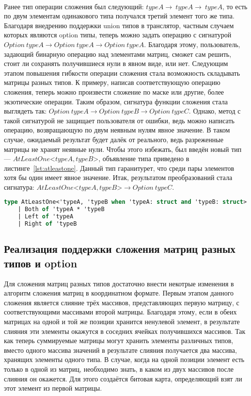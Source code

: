 \documentclass[14pt]{matmex-diploma-custom}
\begin{document}
\paragraph{} Ранее тип операции сложения был следующий: $typeA \rightarrow\ typeA \rightarrow\ typeA$, то есть по двум элементам одинакового типа получался третий элемент того же типа. Благодаря внедрению поддержки union типов в транслятор, частным случаем которых являются option типы, теперь можно задать операцию с сигнатурой $Option\ typeA \rightarrow Option\ typeA \rightarrow Option\ typeA$. Благодаря этому, пользователь, задающий бинарную операцию над элементами матриц, сможет сам решить, стоит ли сохранять получившиеся нули в явном виде, или нет. Следующим этапом повышения гибкости операции сложения стала возможность складывать матрицы разных типов. К примеру, написав соответствующую операцию сложения, теперь можно произвести сложение по маске или другие, более экзотические операции. Таким образом, сигнатура функции сложения стала выглядеть так: $Option\ typeA \rightarrow Option\ typeB \rightarrow Option\ typeC$. Однако, метод с такой сигнатурой не защищает пользователя от ошибки, ведь можно написать операцию, возвращающую по двум неявным нулям явное значение. В таком случае, ожидаемый результат будет далёк от реального, ведь разреженные матрицы не хранят неявные нули. Чтобы этого избежать, был введён новый тип --- $AtLeastOne$<$typeA, typeB$>, объявление типа приведено в листинге~\ref{lst:atleastone}. Данный тип гаранитурет, что среди пары элементов хотя бы один имеет явное значение. Итак, результатом преобразований стала сигнатура: $AtLeastOne$<$typeA, typeB$>$ \rightarrow Option\ typeC$.

\begin{lstlisting}[caption={Объявление типа AtLeastOne},label={lst:atleastone},language=FSharp, basicstyle=\small]
type AtLeastOne<'typeA, 'typeB when 'typeA: struct and 'typeB: struct> =
    | Both of 'typeA * 'typeB
    | Left of 'typeA
    | Right of 'typeB
\end{lstlisting}


\subsection{Реализация поддержки сложения матриц разных типов и option}
Для сложения матриц разных типов достаточно внести некотрые изменения в алгоритм сложения матриц в координатном формате. Первым этапом данного сложения является слияние трёх массивов, представляющих первую матрицу, с соответствующими массивами второй матрицы. Благодаря этому, если в обеих матрицах на одной и той же позиции хранится ненулевой элемент, в результате слияния эти элементы окажутся в соседних ячейках получившихся массивов. Так как теперь суммируемые матрицы могут хранить элементы различных типов, вместо одного массива значений в результате слияния получается два массива, хранящих элементы одного типа. В случае, когда на одной позиции элемент есть только в одной из матриц, необходимо знать, в каком из двух массивов после слияния он окажется. Для этого создаётся битовая карта, определяющий взят ли этот элемент из первой матрицы.
\end{document}
